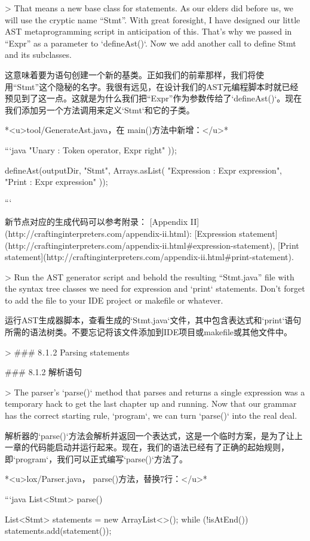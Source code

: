 \documentclass[cn,11pt,chinese]{elegantbook}
\begin{document}
{{{> That means a new base class for statements. As our elders did before us, we will use the cryptic name “Stmt”. With great foresight, I have designed our little AST metaprogramming script in anticipation of this. That’s why we passed in “Expr” as a parameter to `defineAst()`. Now we add another call to define Stmt and its subclasses.

这意味着要为语句创建一个新的基类。正如我们的前辈那样，我们将使用“Stmt”这个隐秘的名字。我很有远见，在设计我们的AST元编程脚本时就已经预见到了这一点。这就是为什么我们把“Expr”作为参数传给了`defineAst()`。现在我们添加另一个方法调用来定义`Stmt`和它的子类。

*<u>tool/GenerateAst.java，在 main()方法中新增：</u>*

```java
      "Unary    : Token operator, Expr right"
    ));
    
    defineAst(outputDir, "Stmt", Arrays.asList(
      "Expression : Expr expression",
      "Print      : Expr expression"
    ));
  }
```

新节点对应的生成代码可以参考附录： [Appendix II](http://craftinginterpreters.com/appendix-ii.html): [Expression statement](http://craftinginterpreters.com/appendix-ii.html#expression-statement), [Print statement](http://craftinginterpreters.com/appendix-ii.html#print-statement).

> Run the AST generator script and behold the resulting “Stmt.java” file with the syntax tree classes we need for expression and `print` statements. Don’t forget to add the file to your IDE project or makefile or whatever.

运行AST生成器脚本，查看生成的`Stmt.java`文件，其中包含表达式和`print`语句所需的语法树类。不要忘记将该文件添加到IDE项目或makefile或其他文件中。

> ### 8 . 1 . 2 Parsing statements

### 8.1.2 解析语句

> The parser’s `parse()` method that parses and returns a single expression was a temporary hack to get the last chapter up and running. Now that our grammar has the correct starting rule, `program`, we can turn `parse()` into the real deal.

解析器的`parse()`方法会解析并返回一个表达式，这是一个临时方案，是为了让上一章的代码能启动并运行起来。现在，我们的语法已经有了正确的起始规则，即`program`，我们可以正式编写`parse()`方法了。

*<u>lox/Parser.java， parse()方法，替换7行：</u>*

```java
  List<Stmt> parse() {
    List<Stmt> statements = new ArrayList<>();
    while (!isAtEnd()) {
      statements.add(statement());
    }

}}}
\end{document}
